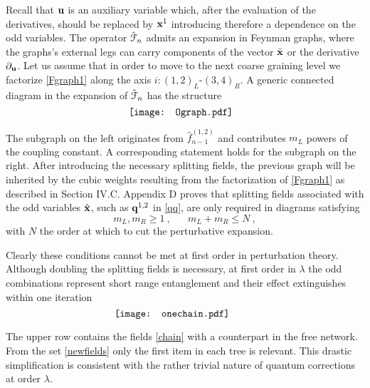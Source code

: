 \documentclass[a4paper,preprintnumbers,nofootinbib,twocolumn]{quantumarticle}
\newcommand{\be}{\begin{equation}} \newcommand{\ee}{\end{equation}}
\begin{document}
\noindent 
Recall that ${\bf u}$ is an auxiliary variable which, after the evaluation of the derivatives, should be replaced by ${\bf x}^1$ introducing therefore a dependence on the odd variables.
The operator ${\hat {\cal F}}_n$ admits an expansion in Feynman graphs, where the graphs's external legs can carry components of the vector ${\bar {\bf x}}$ or the derivative $\partial_{\bf u}$.
Let us assume that in order to move to the next coarse graining level we factorize \eqref{Fgraph1} along the axis $i: (1,2)_L$-$(3,4)_R$.
A generic connected diagram in the expansion of ${\hat {\cal F}}_n$ has the structure
\vspace*{-4.0cm}
\begin{equation}
\vcenter{\hbox{\hspace{-14mm} \texttt{[image: Ograph.pdf]}}} \hspace{-10mm} 
\label{LRgraph1}
\end{equation}
\vspace*{-4.0cm}

\noindent 
The subgraph on the left originates from ${\hat f}_{n-1}^{(1,2)}$ and contributes $m_L$ powers of the coupling constant.
A corresponding statement holds for the subgraph on the right.
After introducing the necessary splitting fields, the previous graph will be inherited by the cubic weights resulting from the factorization of \eqref{Fgraph1} as described in Section IV.C.
Appendix D proves that
splitting fields associated with the odd variables ${\hat {\bf x}}$, such as ${\bf q}^{1,2}$ in \eqref{qq}, are only required in diagrams satisfying
\be
m_L, m_R \geq 1 \ , \;\;\;\;\;\; m_L+m_R \leq N \ ,
\label{oddfact1}
\ee
with $N$ the order at which to cut the perturbative expansion.

Clearly these conditions cannot be met at first order in perturbation theory.
Although doubling the splitting fields is necessary, at first order in $\lambda$ the odd combinations represent short range entanglement and their effect extinguishes within one iteration
\vspace*{-2.1cm}
\begin{equation}
 \vcenter{\hbox{\hspace{-15mm} \texttt{[image: onechain.pdf]}}} \hspace{-10mm} \label{onechain}  \hspace{3mm} \ .
\end{equation}
\vspace*{-2.3cm}

\noindent  The upper row contains the fields \eqref{chain} with a counterpart in the free network. 
From the set \eqref{newfields} only the first item in each tree is relevant. This drastic simplification is consistent with the rather trivial nature of quantum corrections at order $\lambda$.
\end{document}
